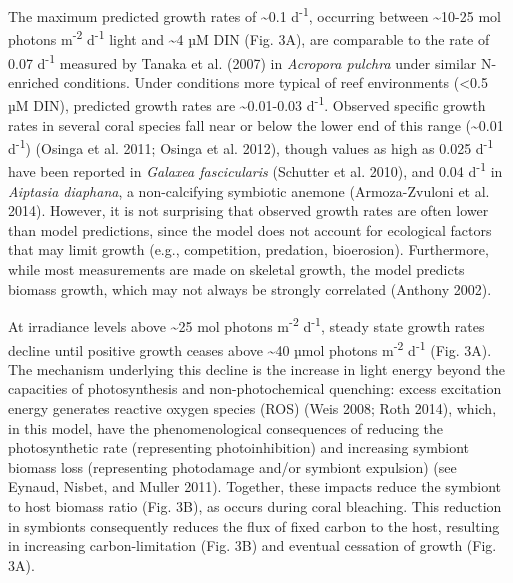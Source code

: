 \documentclass[]{elsarticle} %
\begin{document}
The maximum predicted growth rates of \textasciitilde{}0.1
d\textsuperscript{-1}, occurring between \textasciitilde{}10-25 mol
photons m\textsuperscript{-2} d\textsuperscript{-1} light and
\textasciitilde{}4 µM DIN (Fig. 3A), are comparable to the rate of 0.07
d\textsuperscript{-1} measured by Tanaka et al. (2007) in \emph{Acropora
pulchra} under similar N-enriched conditions. Under conditions more
typical of reef environments (\textless{}0.5 µM DIN), predicted growth
rates are \textasciitilde{}0.01-0.03 d\textsuperscript{-1}. Observed
specific growth rates in several coral species fall near or below the
lower end of this range (\textasciitilde{}0.01 d\textsuperscript{-1})
(Osinga et al. 2011; Osinga et al. 2012), though values as high as 0.025
d\textsuperscript{-1} have been reported in \emph{Galaxea fascicularis}
(Schutter et al. 2010), and 0.04 d\textsuperscript{-1} in \emph{Aiptasia
diaphana}, a non-calcifying symbiotic anemone (Armoza-Zvuloni et al.
2014). However, it is not surprising that observed growth rates are
often lower than model predictions, since the model does not account for
ecological factors that may limit growth (e.g., competition, predation,
bioerosion). Furthermore, while most measurements are made on skeletal
growth, the model predicts biomass growth, which may not always be
strongly correlated (Anthony 2002).

At irradiance levels above \textasciitilde{}25 mol photons
m\textsuperscript{-2} d\textsuperscript{-1}, steady state growth rates
decline until positive growth ceases above \textasciitilde{}40 µmol
photons m\textsuperscript{-2} d\textsuperscript{-1} (Fig. 3A). The
mechanism underlying this decline is the increase in light energy beyond
the capacities of photosynthesis and non-photochemical quenching: excess
excitation energy generates reactive oxygen species (ROS) (Weis 2008;
Roth 2014), which, in this model, have the phenomenological consequences
of reducing the photosynthetic rate (representing photoinhibition) and
increasing symbiont biomass loss (representing photodamage and/or
symbiont expulsion) (see Eynaud, Nisbet, and Muller 2011). Together,
these impacts reduce the symbiont to host biomass ratio (Fig. 3B), as
occurs during coral bleaching. This reduction in symbionts consequently
reduces the flux of fixed carbon to the host, resulting in increasing
carbon-limitation (Fig. 3B) and eventual cessation of growth (Fig. 3A).
\end{document}
